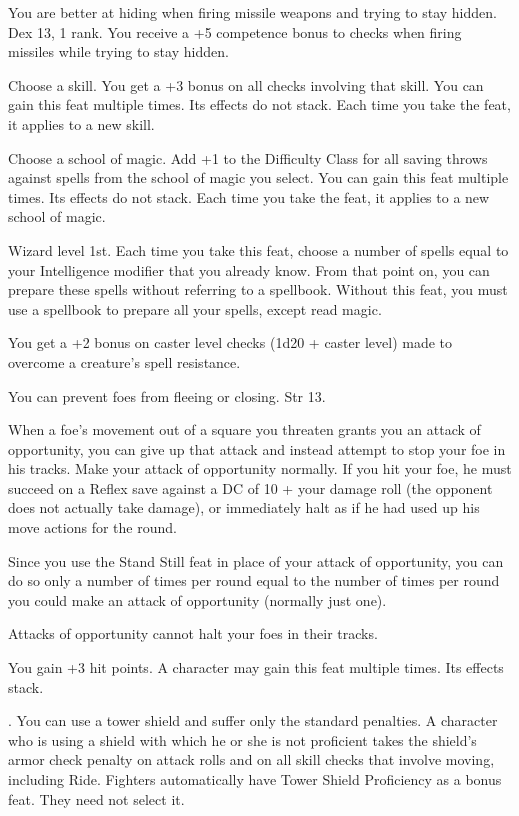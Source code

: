 {You are better at hiding when firing missile weapons and trying to stay hidden.}
{Dex 13,  1 rank.}
{You receive a +5 competence bonus to  checks when firing missiles while trying to stay hidden.}{}{}

{Choose a skill.}{}
{You get a +3 bonus on all checks involving that skill.}{}
{You can gain this feat multiple times. Its effects do not stack. Each time you take the feat, it applies to a new skill.}

{Choose a school of magic.}{}
{Add +1 to the Difficulty Class for all saving throws against spells from the school of magic you select.}{}
{You can gain this feat multiple times. Its effects do not stack. Each time you take the feat, it applies to a new school of magic.}

{Wizard level 1st.}
{Each time you take this feat, choose a number of spells equal to your Intelligence modifier that you already know. From that point on, you can prepare these spells without referring to a spellbook.}
{Without this feat, you must use a spellbook to prepare all your spells, except read magic.}{}

{You get a +2 bonus on caster level checks (1d20 + caster level) made to overcome a creature's spell resistance.}

{You can prevent foes from fleeing or closing.}
{Str 13.}
{When a foe's movement out of a square you threaten grants you an attack of opportunity, you can give up that attack and instead attempt to stop your foe in his tracks. Make your attack of opportunity normally. If you hit your foe, he must succeed on a Reflex save against a DC of 10 + your damage roll (the opponent does not actually take damage), or immediately halt as if he had used up his move actions for the round.

Since you use the Stand Still feat in place of your attack of opportunity, you can do so only a number of times per round equal to the number of times per round you could make an attack of opportunity (normally just one).}
{Attacks of opportunity cannot halt your foes in their tracks.}{}

{}{}
{You gain +3 hit points.}{}
{A character may gain this feat multiple times. Its effects stack.}

{}
{.}
{You can use a tower shield and suffer only the standard penalties.}
{A character who is using a shield with which he or she is not proficient takes the shield's armor check penalty on attack rolls and on all skill checks that involve moving, including Ride.}
{Fighters automatically have Tower Shield Proficiency as a bonus feat. They need not select it.}


